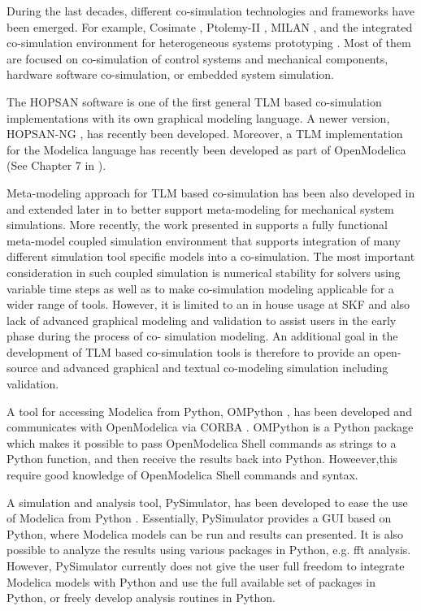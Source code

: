 During the last decades, different co-simulation technologies and frameworks have been emerged.  For example, Cosimate \cite{tnisoftware}, Ptolemy-II \cite{cosimulationptolemy}, MILAN \cite{cosimulationmilan}, and the integrated co-simulation environment for heterogeneous systems prototyping \cite{cosimulationyongjoo}. Most of them are focused on co-simulation of control systems and mechanical components, hardware software co-simulation, or embedded system simulation. 

The HOPSAN \cite{hopsanusersguide} software is one of the first general TLM based co-simulation implementations with its own graphical modeling language. A newer version, HOPSAN-NG \cite{hospanaxin}, has recently been developed. Moreover, a TLM implementation for the Modelica language has recently been developed as part of OpenModelica (See Chapter 7 in \cite{tlmmartin}).

Meta-modeling approach for TLM based co-simulation has been also developed in \cite{tlmalexander05} and extended later in \cite{tlmsiemers06,tlmsiemers07} to better support meta-modeling for mechanical system simulations. More recently, the work presented in \cite{tlmsiemers09} supports a fully functional meta-model coupled simulation environment that supports integration of many different simulation tool specific models into a co-simulation. The most important consideration in such coupled simulation is numerical stability for solvers using variable time steps as well as to make co-simulation modeling applicable for a wider range of tools. However, it is limited to an in house usage at SKF and also lack of advanced graphical modeling and validation to assist users in the early phase during the process of co- simulation modeling. An additional goal in the development of TLM based co-simulation tools is therefore to provide an open-source and advanced graphical and textual co-modeling simulation including validation.

A tool for accessing Modelica from Python, OMPython \cite{ompythonanandthesis}, has been developed and communicates with OpenModelica via CORBA .  OMPython is a Python package which makes it possible to pass OpenModelica Shell commands as strings to a Python function, and then receive the results back into Python. Howeever,this require good knowledge of OpenModelica Shell commands and syntax. 

A simulation and analysis tool, PySimulator, has been developed to ease the use of Modelica from Python \cite{pysimulator}. Essentially, PySimulator provides a GUI based on Python, where Modelica models can be run and results can presented. It is also possible to analyze the results using various packages in Python, e.g. \acrshort{fft} analysis. However, PySimulator currently does not give the user full freedom to integrate Modelica models with Python and use the full available set of packages in Python, or freely develop analysis routines in Python.

